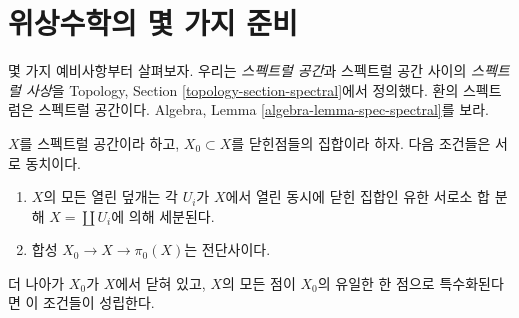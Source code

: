\section{위상수학의 몇 가지 준비}
\label{section-topology}

\noindent
몇 가지 예비사항부터 살펴보자.
우리는 {\it 스펙트럴 공간}과 스펙트럴 공간 사이의
{\it 스펙트럴 사상}을
Topology, Section \ref{topology-section-spectral}에서 정의했다.
환의 스펙트럼은 스펙트럴 공간이다. Algebra, Lemma
\ref{algebra-lemma-spec-spectral}를 보라.

\begin{lemma}
\label{lemma-spectral-split}
$X$를 스펙트럴 공간이라 하고, $X_0 \subset X$를 닫힌점들의 집합이라 하자.
다음 조건들은 서로 동치이다.
\begin{enumerate}
\item $X$의 모든 열린 덮개는 각 $U_i$가 $X$에서 열린 동시에 닫힌
집합인 유한 서로소 합 분해 $X = \coprod U_i$에 의해 세분된다.
\item 합성 $X_0 \to X \to \pi_0(X)$는 전단사이다.
\end{enumerate}
더 나아가 $X_0$가 $X$에서 닫혀 있고, $X$의 모든 점이 $X_0$의
유일한 한 점으로 특수화된다면 이 조건들이 성립한다.
\end{lemma}

